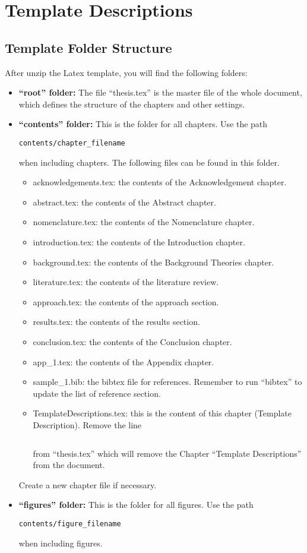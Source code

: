 \section{Template Descriptions}

\subsection{Template Folder Structure}
	After unzip the Latex template, you will find the following folders:
\begin{itemize}
	\item \textbf{``root'' folder:} The file ``thesis.tex'' is the master file of the whole document, which defines the structure of the chapters and other settings.
	\item \textbf{``contents'' folder:}  This is the folder for all chapters. Use the path \begin{verbatim}contents/chapter_filename\end{verbatim} when including chapters. The following files can be found in this folder.
	\begin{itemize}
		\item acknowledgements.tex: the contents of the Acknowledgement chapter. 
		\item abstract.tex: the contents of the Abstract chapter. 
		\item nomenclature.tex: the contents of the Nomenclature chapter. 
		\item introduction.tex: the contents of the Introduction chapter. 
		\item background.tex: the contents of the Background Theories chapter. 
		\item literature.tex: the contents of the literature review.
		\item approach.tex: the contents of the approach section.
		\item results.tex: the contents of the results section. 
		\item conclusion.tex: the contents of the Conclusion chapter. 
		\item app\_1.tex: the contents of the Appendix chapter. 
		\item sample\_1.bib: the bibtex file for references. Remember to run ``bibtex'' to update the list of reference section.
		\item TemplateDescriptions.tex: this is the content of this chapter (Template Description). Remove the line \begin{verbatim} \end{verbatim} from ``thesis.tex'' which will remove the Chapter ``Template Descriptions'' from the document.
	\end{itemize}
	Create a new chapter file if necessary.
	\item \textbf{``figures'' folder:} This is the folder for all figures. Use the path \begin{verbatim}contents/figure_filename\end{verbatim} when including figures.
\end{itemize}

